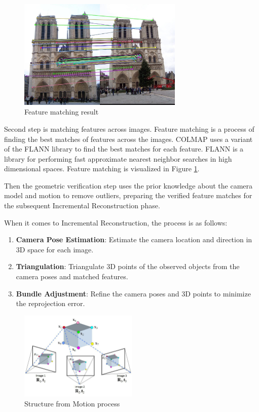 \begin{figure}[h]
  \centering
  \includegraphics[width=0.7\textwidth]{images/related-work/feature-matching.jpg}
  \caption{Feature matching result}
  \label{fig:matching-features}
\end{figure}

Second step is matching features across images. Feature matching is a
process of finding the best matches of features across the images.
COLMAP uses a variant of the FLANN \cite{flann} library to find the
best matches for each feature. FLANN is a library for performing fast
approximate nearest neighbor searches in high dimensional spaces.
Feature matching is visualized in Figure \ref{fig:matching-features}.

Then the geometric verification step uses the prior knowledge about
the camera model and motion to remove outliers, preparing the
verified feature matches for the subsequent Incremental Reconstruction phase.

When it comes to Incremental Reconstruction, the process is as follows:
\begin{enumerate}
  \item \textbf{Camera Pose Estimation}: Estimate the camera location
    and direction in 3D space for each image.
  \item \textbf{Triangulation}: Triangulate 3D points of the observed
    objects from the camera poses and matched features.
  \item \textbf{Bundle Adjustment}: Refine the camera poses and 3D
    points to minimize the reprojection error.
\end{enumerate}

\begin{figure}[h]
  \centering
  \includegraphics[width=0.5\textwidth]{images/related-work/Structure-from-Motion-SfM-process-is-illustrated-The-structure-in-the.png}
  \caption{Structure from Motion process}
  \label{fig:structure-from-motion}
\end{figure}

